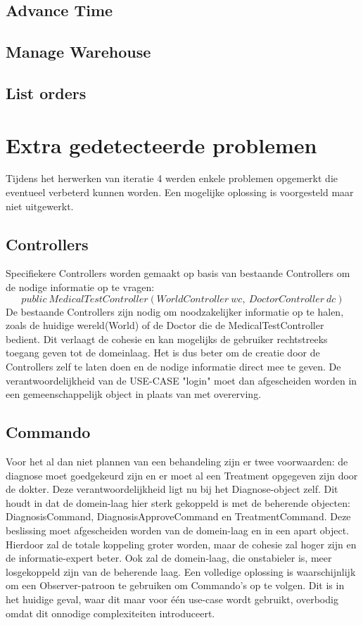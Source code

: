 \subsection{Advance Time}
\subsection{Manage Warehouse}
\subsection{List orders}


\section{Extra gedetecteerde problemen}
Tijdens het herwerken van iteratie 4 werden enkele problemen opgemerkt die eventueel verbeterd kunnen worden. 
Een mogelijke oplossing is voorgesteld maar niet uitgewerkt.

\subsection{Controllers}
Specifiekere Controllers worden gemaakt op basis van bestaande Controllers om de nodige informatie op te vragen: 
\[public\ MedicalTestController(WorldController\ wc,\ DoctorController\ dc)\]
De bestaande Controllers zijn nodig om noodzakelijker informatie op te halen, zoals de huidige wereld(World) of de Doctor die de MedicalTestController bedient. 
Dit verlaagt de cohesie en kan mogelijks de gebruiker rechtstreeks toegang geven tot de domeinlaag.
Het is dus beter om de creatie door de Controllers zelf te laten doen en de nodige informatie direct mee te geven. 
De verantwoordelijkheid van de USE-CASE "login" moet dan afgescheiden worden in een gemeenschappelijk object in plaats van met overerving.

\subsection{Commando} 
Voor het al dan niet plannen van een behandeling zijn er twee voorwaarden: 
de diagnose moet goedgekeurd zijn en er moet al een Treatment opgegeven zijn door de dokter. 
Deze verantwoordelijkheid ligt nu bij het Diagnose-object zelf. 
Dit houdt in dat de domein-laag hier sterk gekoppeld is met de beherende objecten: DiagnosisCommand, DiagnosisApproveCommand en TreatmentCommand. 
Deze beslissing moet afgescheiden worden van de domein-laag en in een apart object. 
Hierdoor zal de totale koppeling groter worden, maar de cohesie zal hoger zijn en de informatie-expert beter. 
Ook zal de domein-laag, die onstabieler is, meer losgekoppeld zijn van de beherende laag.
Een volledige oplossing is waarschijnlijk om een Observer-patroon te gebruiken om Commando's op te volgen.
Dit is in het huidige geval, waar dit maar voor één use-case wordt gebruikt, overbodig omdat dit onnodige complexiteiten introduceert. 
